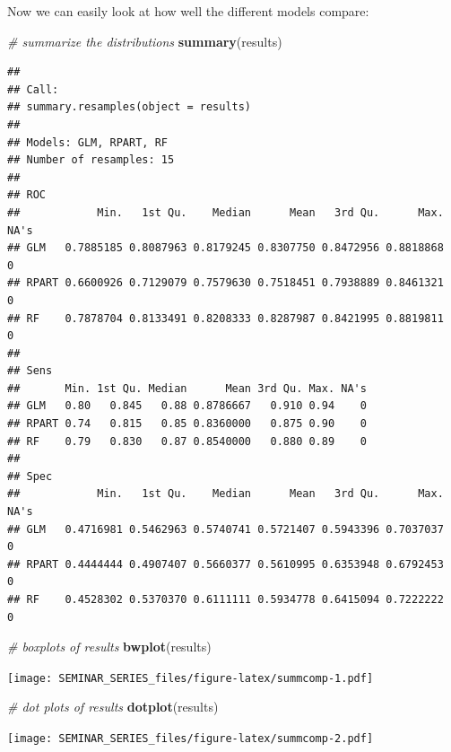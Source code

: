 \documentclass[]{book}
\newenvironment{Shaded}{\begin{snugshade}}{\end{snugshade}}
\newcommand{\KeywordTok}[1]{\textcolor[rgb]{0.13,0.29,0.53}{\textbf{#1}}}
\newcommand{\CommentTok}[1]{\textcolor[rgb]{0.56,0.35,0.01}{\textit{#1}}}
\newcommand{\NormalTok}[1]{#1}
\begin{document}
Now we can easily look at how well the different models compare:

\begin{Shaded}
\begin{Highlighting}[]
\CommentTok{# summarize the distributions}
\KeywordTok{summary}\NormalTok{(results)}
\end{Highlighting}
\end{Shaded}

\begin{verbatim}
## 
## Call:
## summary.resamples(object = results)
## 
## Models: GLM, RPART, RF 
## Number of resamples: 15 
## 
## ROC 
##            Min.   1st Qu.    Median      Mean   3rd Qu.      Max. NA's
## GLM   0.7885185 0.8087963 0.8179245 0.8307750 0.8472956 0.8818868    0
## RPART 0.6600926 0.7129079 0.7579630 0.7518451 0.7938889 0.8461321    0
## RF    0.7878704 0.8133491 0.8208333 0.8287987 0.8421995 0.8819811    0
## 
## Sens 
##       Min. 1st Qu. Median      Mean 3rd Qu. Max. NA's
## GLM   0.80   0.845   0.88 0.8786667   0.910 0.94    0
## RPART 0.74   0.815   0.85 0.8360000   0.875 0.90    0
## RF    0.79   0.830   0.87 0.8540000   0.880 0.89    0
## 
## Spec 
##            Min.   1st Qu.    Median      Mean   3rd Qu.      Max. NA's
## GLM   0.4716981 0.5462963 0.5740741 0.5721407 0.5943396 0.7037037    0
## RPART 0.4444444 0.4907407 0.5660377 0.5610995 0.6353948 0.6792453    0
## RF    0.4528302 0.5370370 0.6111111 0.5934778 0.6415094 0.7222222    0
\end{verbatim}

\begin{Shaded}
\begin{Highlighting}[]
\CommentTok{# boxplots of results}
\KeywordTok{bwplot}\NormalTok{(results)}
\end{Highlighting}
\end{Shaded}

\texttt{[image: SEMINAR\_SERIES\_files/figure-latex/summcomp-1.pdf]}

\begin{Shaded}
\begin{Highlighting}[]
\CommentTok{# dot plots of results}
\KeywordTok{dotplot}\NormalTok{(results)}
\end{Highlighting}
\end{Shaded}

\texttt{[image: SEMINAR\_SERIES\_files/figure-latex/summcomp-2.pdf]}


\end{document}
